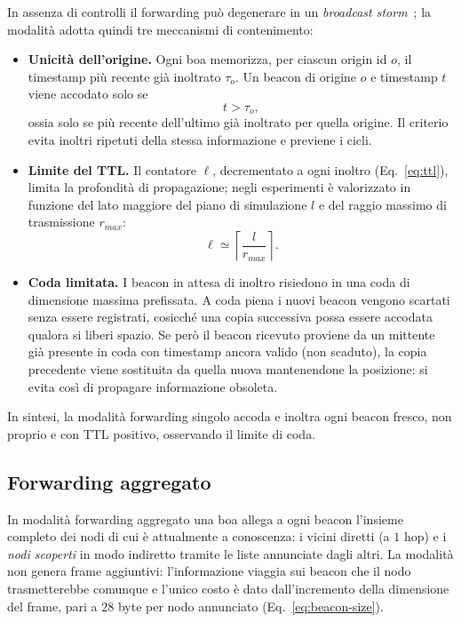 In assenza di controlli il forwarding pu\`o degenerare in un \emph{broadcast storm}~\cite{broadcaststorm};
la modalit\`a adotta quindi tre meccanismi di contenimento:
\begin{itemize}[leftmargin=1.4em,nosep]
  \item \textbf{Unicit\`a dell'origine.} Ogni boa memorizza, per ciascun origin id
  $o$, il timestamp pi\`u recente gi\`a inoltrato $\tau_o$. Un beacon di origine $o$ e
  timestamp $t$ viene accodato solo se
  \begin{equation}
    t > \tau_o,
    \label{eq:dedup}
  \end{equation}
  ossia solo se pi\`u recente dell'ultimo gi\`a inoltrato per quella origine. Il criterio
  evita inoltri ripetuti della stessa informazione e previene i cicli.
  \item \textbf{Limite del TTL.} Il contatore $\ell$, decrementato a ogni inoltro
  (Eq.~\ref{eq:ttl}), limita la profondit\`a di propagazione; negli esperimenti \`e
  valorizzato in funzione del lato maggiore del piano di simulazione $l$ e del raggio massimo di trasmissione $r_{max}$:
  \begin{equation}
    \ell \simeq \left\lceil\frac{l}{r_{max}}\right\rceil.
    \label{eq:ttl-value}
  \end{equation}
  \item \textbf{Coda limitata.} I beacon in attesa di inoltro risiedono in una coda di
  dimensione massima prefissata. A coda piena i nuovi beacon vengono
  scartati senza essere registrati, cosicch\'e una copia successiva possa essere accodata
  qualora si liberi spazio. Se per\`o il beacon ricevuto proviene da un mittente gi\`a
  presente in coda con timestamp ancora valido (non scaduto), la copia precedente viene
  sostituita da quella nuova mantenendone la posizione: si evita cos\`i di propagare
  informazione obsoleta.
\end{itemize}
In sintesi, la modalit\`a forwarding singolo accoda e inoltra ogni beacon fresco, non
proprio e con TTL positivo, osservando il limite di coda.

\subsection{Forwarding aggregato}
\label{sec:append}
In modalit\`a forwarding aggregato una boa allega a ogni beacon l'insieme completo dei nodi di cui \`e
attualmente a conoscenza: i vicini diretti (a $1$ hop) e i \emph{nodi scoperti} in modo
indiretto tramite le liste annunciate dagli altri. La modalit\`a non genera frame
aggiuntivi: l'informazione viaggia sui beacon che il nodo trasmetterebbe comunque e
l'unico costo \`e dato dall'incremento della dimensione del frame, pari a $28$ byte per nodo
annunciato (Eq.~\ref{eq:beacon-size}).

